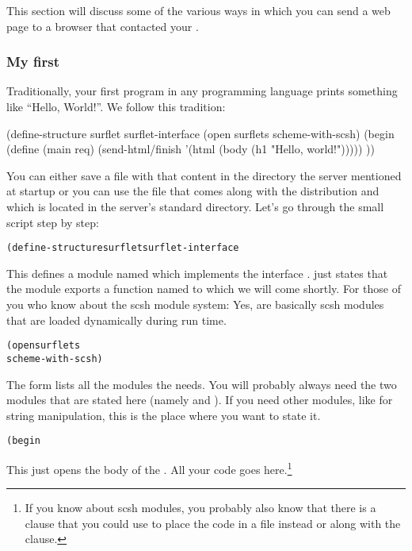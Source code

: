 This section will discuss some of the various ways in which you can
send a web page to a browser that contacted your \surflet.

\subsubsection{My first \surflet}
\label{sec:first-surflet}

Traditionally,  your first program in any programming language prints
something like ``Hello, World!''.  We follow this tradition:

\begin{listing}
(define-structure surflet surflet-interface
  (open surflets
        scheme-with-scsh)
  (begin
    (define (main req)
      (send-html/finish
       '(html (body (h1 "Hello, world!")))))
    ))
\end{listing}

You can either save a file with that content in the \surflets
directory the server mentioned at startup or you can use the file
 that comes along with the \surflets
distribution and which is located in the server's standard \surflets
directory.  Let's go through the small script step by step:

\begin{alltt}
(define-structure surflet surflet-interface
\end{alltt}

This defines a module named  which implements the
interface .   just
states that the module exports a function named  to which
we will come shortly.  For those of you who know about the scsh module
system: Yes, \surflets are basically scsh modules that are loaded
dynamically during run time.

\begin{alltt}
  (open surflets
        scheme-with-scsh)
\end{alltt}

The  form lists all the modules the \surflet needs.  You
will probably always need the two modules that are stated here
(namely  and ).  If you need
other modules, like  for string manipulation, this is
the place where you want to state it.

\begin{alltt}
  (begin
\end{alltt}

This just opens the body of the \surflet.  All your \surflet code goes
here.\footnote{If you know about scsh modules, you probably also know
that there is a  clause that you could use to place the
code in a file instead or along with the  clause.}


